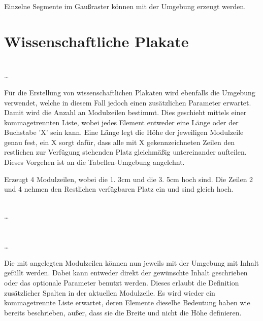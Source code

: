 \documentclass[a4paper,11pt]{tubsreprt}
\begin{document}
Einzelne Segmente im Gaußraster können mit der Umgebung 
erzeugt werden.

\section{Wissenschaftliche Plakate}

\begin{Declaration}
    \\
  \quad\dots\\
\end{Declaration}

Für die Erstellung von wissenschaftlichen Plakaten wird ebenfalls die Umgebung
 verwendet, welche in diesem Fall jedoch einen
zusätzlichen Parameter  erwartet.
Damit wird die Anzahl an Modulzeilen bestimmt. Dies geschieht mittels
einer kommagetrennten Liste, wobei jedes Element entweder eine Länge
oder der Buchstabe 'X' sein kann. Eine Länge legt die Höhe der jeweiligen
Modulzeile genau fest, ein X sorgt dafür, dass alle mit X gekennzeichneten
Zeilen den restlichen zur Verfügung stehenden Platz gleichmäßig untereinander
aufteilen. Dieses Vorgehen ist an die Tabellen-Umgebung 
angelehnt.

\begin{Example}
  \noindent{}
    \par
  \noindent Erzeugt 4 Modulzeilen, wobei die 1. 3cm und die 3. 5cm hoch sind.
  Die Zeilen 2 und 4 nehmen den Restlichen verfügbaren Platz ein
  und sind gleich hoch.
\end{Example}


\begin{Declaration}
    \\%
  \quad\dots\\
  \\
    \\%
  \quad\dots\\
\end{Declaration}

Die mit  angelegten Modulzeilen können nun jeweils mit
der Umgebung  mit Inhalt gefüllt werden.
Dabei kann entweder direkt der gewünschte Inhalt geschrieben oder das optionale
Parameter  benutzt werden.
Dieses erlaubt die Definition zusätzlicher Spalten in der aktuellen Modulzeile.
Es wird wieder ein kommagetrennte Liste erwartet,
deren Elemente dieselbe Bedeutung haben wie bereits beschrieben, außer, dass
sie die Breite und nicht die Höhe definieren.
\end{document}
